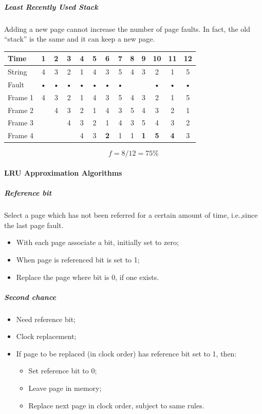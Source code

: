 \subparagraph{Least Recently Used Stack}
Adding a new page cannot increase the number of page faults. In fact, the old ``stack'' is the same and it can keep a new page.
\begin{center}
\begin{tabular}{l|cccccccccccc}
\hline
Time & 1 & 2 & 3 & 4 & 5 & 6 & 7 & 8 & 9 & 10 & 11 & 12 \\
\hline
String & 4 & 3 & 2 & 1 & 4 & 3 & 5 & 4 & 3 & 2 & 1 & 5 \\
\hline
Fault & • & • & • & • & • & • & • & & & • & • & • \\
\hline
Frame 1 & 4 & 3 & 2 & 1 & 4 & 3 & 5 & 4 & 3 & 2 & 1 & 5 \\
Frame 2 & & 4 & 3 & 2 & 1 & 4 & 3 & 5 & 4 & 3 & 2 & 1 \\
Frame 3 & & & 4 & 3 & 2 & 1 & 4 & 3 & 5 & 4 & 3 & 2 \\
Frame 4 & & & & 4 & 3 & \textbf{2} & 1 & 1 & \textbf{1} & \textbf{5} & \textbf{4} & 3 \\
\hline
\end{tabular}
\[ f = 8/12 = 75 \% \]
\end{center}

\paragraph{LRU Approximation Algorithms}
\subparagraph{Reference bit}
Select a page which has not been referred for a certain amount of time, i.e.,\@ since the last page fault.
\begin{itemize}
\item With each page associate a bit, initially set to zero;
\item When page is referenced bit is set to 1;
\item Replace the page where bit is 0, if one exists.
\end{itemize}
\subparagraph{Second chance}
\begin{itemize}
\item Need reference bit;
\item Clock replacement;
\item If page to be replaced (in clock order) has reference bit set to 1, then:
\begin{itemize}
\item Set reference bit to 0;
\item Leave page in memory;
\item Replace next page in clock order, subject to same rules.
\end{itemize}
\end{itemize}

